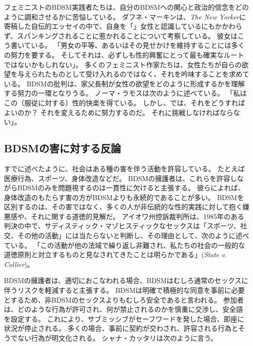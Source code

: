 \documentclass[paper=a4,book,openany]{jlreq}
\begin{document}
フェミニストのBDSM実践者たちは、自分のBDSMへの関心と政治的信念をどのように調和させるかに苦悩している。
ダフネ・マーキンは、\emph{The New Yorker}に寄稿した自伝的エッセイの中で、自身を「」女性と認識しているにもかかわらず、スパンキングされることに惹かれることについて考察している。
彼女はこう書いている。
「男女の平等、あるいはその見せかけを維持することには多くの努力を要する。
そしてそれは、必ずしも性的興奮にとって最も確実なルートではないかもしれない」\citep{merkin96:_unlik_obses}。
多くのフェミニスト作家たちは、女性たちが自らの欲望を与えられたものとして受け入れるのではなく、それを吟味することを求めている。
BDSMの批判は、家父長制が女性の欲望をどのように形成するかを理解する努力の一環となりうる。
ノーマ・ラモスは次のように述べている。
「私はこの（服従に対する）性的快楽を得ている。
しかし、では、それをどうすればよいのか？ それを変えるために努力するのだ。
それに挑戦しなければならない」\citep[p.62]{gillespie95:_where_do_we_stand_pornog}。

\subsection{BDSMの害に対する反論}

すでに述べたように、社会はある種の害を伴う活動を許容している。
たとえば医療行為、スポーツ、身体改造などだ。
BDSMの擁護者は、これらを許容しながらBDSMのみを問題視するのは一貫性に欠けると主張する。
彼らによれば、身体改造のもたらす害の方がBDSMよりも永続的であることが多い。
BDSMを区別するのは、その害ではなく、多くの人が非伝統的な性的実践に対して抱く嫌悪感や、それに関する道徳的見解だ。
アイオワ州控訴裁判所は、1985年のある判決の中で、サディスティック・マゾヒスティックなセックスは「スポーツ、社交、その他の活動」には当たらないと判断し、その理由として、次のように述べている。
「この活動が他の法域で繰り返し非難され、私たちの社会の一般的な道徳原則と対立するものと見なされてきたことは明らかである」(\emph{State v. Collier})。

BDSMの擁護者は、適切におこなわれる場合、BDSMはむしろ通常のセックスに伴うリスクを軽減すると主張する。
BDSMは明確で積極的な同意を事前に必要とするため、非BDSMのセックスよりもむしろ安全であると言われる。
参加者は、どのような行為が許可され、何が禁止されるのかを慎重に交渉し、安全語を設定する。
これにより、サブミッシブがセーフワードを発した場合、即座に状況が停止される。
多くの場合、事前に契約が交わされ、許容される行為とそうでない行為が明文化される。
シャナ・カッタリは次のように言う。
\end{document}
